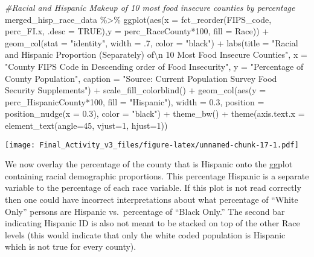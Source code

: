 \documentclass[
]{article}
\newenvironment{Shaded}{\begin{snugshade}}{\end{snugshade}}
\newcommand{\AttributeTok}[1]{\textcolor[rgb]{0.77,0.63,0.00}{#1}}
\newcommand{\CommentTok}[1]{\textcolor[rgb]{0.56,0.35,0.01}{\textit{#1}}}
\newcommand{\ConstantTok}[1]{\textcolor[rgb]{0.00,0.00,0.00}{#1}}
\newcommand{\DecValTok}[1]{\textcolor[rgb]{0.00,0.00,0.81}{#1}}
\newcommand{\FloatTok}[1]{\textcolor[rgb]{0.00,0.00,0.81}{#1}}
\newcommand{\FunctionTok}[1]{\textcolor[rgb]{0.00,0.00,0.00}{#1}}
\newcommand{\NormalTok}[1]{#1}
\newcommand{\SpecialCharTok}[1]{\textcolor[rgb]{0.00,0.00,0.00}{#1}}
\newcommand{\StringTok}[1]{\textcolor[rgb]{0.31,0.60,0.02}{#1}}
\begin{document}
\begin{Shaded}
\begin{Highlighting}[]
\CommentTok{\#Racial and Hispanic Makeup of 10 most food insecure counties by percentage}
\NormalTok{merged\_hisp\_race\_data }\SpecialCharTok{\%\textgreater{}\%}
  \FunctionTok{ggplot}\NormalTok{(}\FunctionTok{aes}\NormalTok{(}\AttributeTok{x =} \FunctionTok{fct\_reorder}\NormalTok{(FIPS\_code, perc\_FI.x, }\AttributeTok{.desc =} \ConstantTok{TRUE}\NormalTok{),}\AttributeTok{y =}\NormalTok{ perc\_RaceCounty}\SpecialCharTok{*}\DecValTok{100}\NormalTok{, }\AttributeTok{fill =}\NormalTok{ Race)) }\SpecialCharTok{+}
  \FunctionTok{geom\_col}\NormalTok{(}\AttributeTok{stat =} \StringTok{"identity"}\NormalTok{, }\AttributeTok{width =}\NormalTok{ .}\DecValTok{7}\NormalTok{, }\AttributeTok{color =} \StringTok{"black"}\NormalTok{) }\SpecialCharTok{+}
  \FunctionTok{labs}\NormalTok{(}\AttributeTok{title =} \StringTok{"Racial and Hispanic Proportion (Separately) of}\SpecialCharTok{\textbackslash{}n}\StringTok{ 10 Most Food Insecure Counties"}\NormalTok{,}
       \AttributeTok{x =} \StringTok{"County FIPS Code in Descending order of Food Insecurity"}\NormalTok{,}
       \AttributeTok{y =} \StringTok{"Percentage of County Population"}\NormalTok{,}
       \AttributeTok{caption =} \StringTok{"Source: Current Population Survey Food Security Supplements"}\NormalTok{) }\SpecialCharTok{+}
  \FunctionTok{scale\_fill\_colorblind}\NormalTok{() }\SpecialCharTok{+} 
  \FunctionTok{geom\_col}\NormalTok{(}\FunctionTok{aes}\NormalTok{(}\AttributeTok{y =}\NormalTok{ perc\_HispanicCounty}\SpecialCharTok{*}\DecValTok{100}\NormalTok{, }\AttributeTok{fill =} \StringTok{"Hispanic"}\NormalTok{), }
         \AttributeTok{width =} \FloatTok{0.3}\NormalTok{,}
         \AttributeTok{position =} \FunctionTok{position\_nudge}\NormalTok{(}\AttributeTok{x =} \FloatTok{0.3}\NormalTok{),}
         \AttributeTok{color =} \StringTok{"black"}\NormalTok{) }\SpecialCharTok{+}
   \FunctionTok{theme\_bw}\NormalTok{() }\SpecialCharTok{+}
  \FunctionTok{theme}\NormalTok{(}\AttributeTok{axis.text.x =} \FunctionTok{element\_text}\NormalTok{(}\AttributeTok{angle=}\DecValTok{45}\NormalTok{, }\AttributeTok{vjust=}\DecValTok{1}\NormalTok{, }\AttributeTok{hjust=}\DecValTok{1}\NormalTok{)) }
\end{Highlighting}
\end{Shaded}

\texttt{[image: Final\_Activity\_v3\_files/figure-latex/unnamed-chunk-17-1.pdf]}

We now overlay the percentage of the county that is Hispanic onto the
ggplot containing racial demographic proportions. This percentage
Hispanic is a separate variable to the percentage of each race variable.
If this plot is not read correctly then one could have incorrect
interpretations about what percentage of ``White Only'' persons are
Hispanic vs.~percentage of ``Black Only.'' The second bar indicating
Hispanic ID is also not meant to be stacked on top of the other Race
levels (this would indicate that only the white coded population is
Hispanic which is not true for every county).
\end{document}
